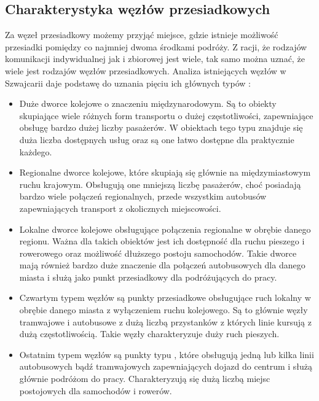 \documentclass[twoside,12pt]{article}
\begin{document}
	\clearpage
	\subsection{Charakterystyka węzłów przesiadkowych}
	
	Za węzeł przesiadkowy możemy przyjąć miejsce, gdzie istnieje możliwość przesiadki pomiędzy co najmniej dwoma środkami podróży. Z racji, że rodzajów komunikacji indywidualnej jak i zbiorowej jest wiele, tak samo można uznać, że wiele jest rodzajów węzłów przesiadkowych. Analiza istniejących węzłów w Szwajcarii daje podstawę do uznania pięciu ich głównych typów \cite{standardy_szwajcarskie}:
	\begin{itemize}
		\item Duże dworce kolejowe o znaczeniu międzynarodowym. Są to obiekty skupiające wiele różnych form transportu o dużej częstotliwości, zapewniające obsługę bardzo dużej liczby pasażerów. W obiektach tego typu znajduje się duża liczba dostępnych usług oraz są one łatwo dostępne dla praktycznie każdego.
		\item Regionalne dworce kolejowe, które skupiają się głównie na międzymiastowym ruchu krajowym. Obsługują one mniejszą liczbę pasażerów, choć posiadają bardzo wiele połączeń regionalnych, przede wszystkim autobusów zapewniających transport z okolicznych miejscowości.
		\item Lokalne dworce kolejowe obsługujące połączenia regionalne w obrębie danego regionu. Ważna dla takich obiektów jest ich dostępność dla ruchu pieszego i rowerowego oraz możliwość dłuższego postoju samochodów. Takie dworce mają również bardzo duże znaczenie dla połączeń autobusowych dla danego miasta i służą jako punkt przesiadkowy dla podróżujących do pracy. 
		\item Czwartym typem węzłów są punkty przesiadkowe obsługujące ruch lokalny w obrębie danego miasta z wyłączeniem ruchu kolejowego. Są to głównie węzły tramwajowe i autobusowe z dużą liczbą przystanków z których linie kursują z dużą częstotliwością. Takie węzły charakteryzuje duży ruch pieszych. 
		\item Ostatnim typem węzłów są punkty typu \pnr{}, które obsługują jedną lub kilka linii autobusowych bądź tramwajowych zapewniających dojazd do centrum i służą głównie podróżom do pracy. Charakteryzują się dużą liczbą miejsc postojowych dla samochodów i rowerów.
	\end{itemize}
	
\end{document}
